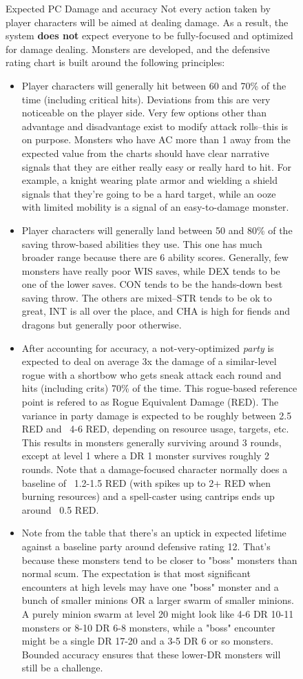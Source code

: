 \begin{figure}
	\begin{DndComment}{Expected PC Damage and accuracy}
		Not every action taken by player characters will be aimed at dealing damage. As a result, the system \textbf{does not} expect everyone to be fully-focused and optimized for damage dealing. Monsters are developed, and the defensive rating chart is built around the following principles:
		\begin{itemize}
			\item Player characters will generally hit between 60 and 70\% of the time (including critical hits). Deviations from this are very noticeable on the player side. Very few options other than advantage and disadvantage exist to modify attack rolls--this is on purpose. Monsters who have AC more than 1 away from the expected value from the charts should have clear narrative signals that they are either really easy or really hard to hit. For example, a knight wearing plate armor and wielding a shield signals that they're going to be a hard target, while an ooze with limited mobility is a signal of an easy-to-damage monster.
			\item Player characters will generally land between 50 and 80\% of the saving throw-based abilities they use. This one has much broader range because there are 6 ability scores. Generally, few monsters have really poor WIS saves, while DEX tends to be one of the lower saves. CON tends to be the hands-down best saving throw. The others are mixed--STR tends to be ok to great, INT is all over the place, and CHA is high for fiends and dragons but generally poor otherwise.
			\item After accounting for accuracy, a not-very-optimized \textit{party} is expected to deal on average 3x the damage of a similar-level rogue with a shortbow who gets sneak attack each round and hits (including crits) 70\% of the time. This rogue-based reference point is refered to as Rogue Equivalent Damage (RED). The variance in party damage is expected to be roughly between 2.5 RED and ~4-6 RED, depending on resource usage, targets, etc. This results in monsters generally surviving around 3 rounds, except at level 1 where a DR 1 monster survives roughly 2 rounds. Note that a damage-focused character normally does a baseline of ~1.2-1.5 RED (with spikes up to 2+ RED when burning resources) and a spell-caster using cantrips ends up around ~0.5 RED.
			\item Note from the table that there's an uptick in expected lifetime against a baseline party around defensive rating 12. That's because these monsters tend to be closer to "boss" monsters than normal scum. The expectation is that most significant encounters at high levels may have one "boss" monster and a bunch of smaller minions OR a larger swarm of smaller minions. A purely minion swarm at level 20 might look like 4-6 DR 10-11 monsters or 8-10 DR 6-8 monsters, while a "boss" encounter might be a single DR 17-20 and a 3-5 DR 6 or so monsters. Bounded accuracy ensures that these lower-DR monsters will still be a challenge.
		\end{itemize}
	\end{DndComment}
\end{figure}

